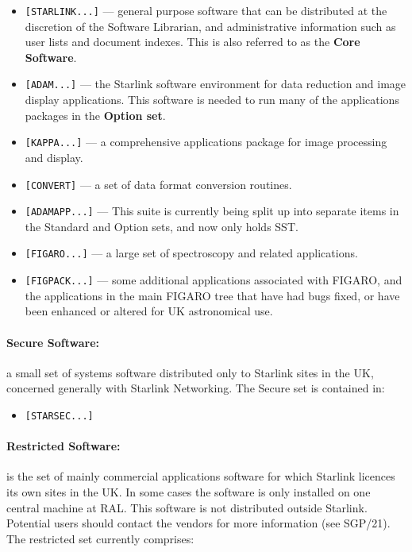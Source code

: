 \begin{itemize}

\item {\tt [STARLINK...]} --- general purpose software that can be distributed at
the discretion of the Software Librarian, and administrative information such
as user lists and document indexes. This is also referred to as the {\bf Core
Software}.

\item {\tt [ADAM...]} --- the Starlink software environment for data reduction
and image display applications. This software is needed to run many of the
applications packages in the {\bf Option set}.

\item {\tt [KAPPA...]} --- a comprehensive applications package for image
processing and display.

\item {\tt [CONVERT]} --- a set of data format conversion routines.

\item {\tt [ADAMAPP...]} --- This suite is currently being split up into
separate items in the Standard and Option sets, and now only holds SST.

\item {\tt [FIGARO...]} --- a large set of spectroscopy and related
applications.

\item {\tt [FIGPACK...]} --- some additional applications associated with
FIGARO, and the applications in the main FIGARO tree that have had bugs fixed,
or have been enhanced or altered for UK astronomical use.

\end{itemize}

\paragraph{Secure Software:} a small set of systems software distributed
only to Starlink sites in the UK, concerned generally with Starlink Networking.
The Secure set is contained in:

\begin{itemize}
\item {\tt [STARSEC...]}
\end{itemize}

\paragraph{Restricted Software:} is the set of mainly commercial applications
software for which Starlink licences its own sites in the UK. In some cases the
software is only installed on one central machine at RAL. This software is not
distributed outside Starlink. Potential users should contact the vendors for
more information (see SGP/21). The restricted set currently comprises:


